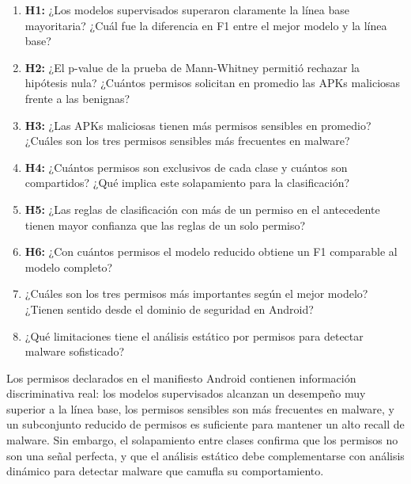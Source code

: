 \documentclass[
  coursetitle={Cómputo Nube y Tecnologías Emergentes},
  coursehours={96},
  coursedate={Verano 2026},
  doctype={Tutorial},
  otherlangs={english,french},
  authorname={Lázaro},
  authorsurname={Bustio-Martínez},
  authortitle={PhD},
  role={Profesor Investigador},
  email={lbustio@inaoe.mx},
  phone={5559504000},
  ext={7459},
  institution={Instituto Nacional de Astrofísica, Óptica y Electrónica (INAOE)},
  department={Maestría en Ciencias en Tecnologías de Seguridad},
  address={Luis Enrique Erro 1, Sta. Ma. Tonantzintla, San Andrés Cholula, CP 72840, Puebla, México},
  margin={0.5in}
]{../../lbustio_lecture_notes}
\begin{document}
\begin{enumerate}
    \item \textbf{H1:} ¿Los modelos supervisados superaron claramente la línea base mayoritaria? ¿Cuál fue la diferencia en F1 entre el mejor modelo y la línea base?
    \item \textbf{H2:} ¿El p-value de la prueba de Mann-Whitney permitió rechazar la hipótesis nula? ¿Cuántos permisos solicitan en promedio las APKs maliciosas frente a las benignas?
    \item \textbf{H3:} ¿Las APKs maliciosas tienen más permisos sensibles en promedio? ¿Cuáles son los tres permisos sensibles más frecuentes en malware?
    \item \textbf{H4:} ¿Cuántos permisos son exclusivos de cada clase y cuántos son compartidos? ¿Qué implica este solapamiento para la clasificación?
    \item \textbf{H5:} ¿Las reglas de clasificación con más de un permiso en el antecedente tienen mayor confianza que las reglas de un solo permiso?
    \item \textbf{H6:} ¿Con cuántos permisos el modelo reducido obtiene un F1 comparable al modelo completo?
    \item ¿Cuáles son los tres permisos más importantes según el mejor modelo? ¿Tienen sentido desde el dominio de seguridad en Android?
    \item ¿Qué limitaciones tiene el análisis estático por permisos para detectar malware sofisticado?
\end{enumerate}

\begin{tcolorbox}[title=Conclusión operativa]
Los permisos declarados en el manifiesto Android contienen información discriminativa real: los modelos supervisados alcanzan un desempeño muy superior a la línea base, los permisos sensibles son más frecuentes en malware, y un subconjunto reducido de permisos es suficiente para mantener un alto recall de malware. Sin embargo, el solapamiento entre clases confirma que los permisos no son una señal perfecta, y que el análisis estático debe complementarse con análisis dinámico para detectar malware que camufla su comportamiento.
\end{tcolorbox}
\end{document}
